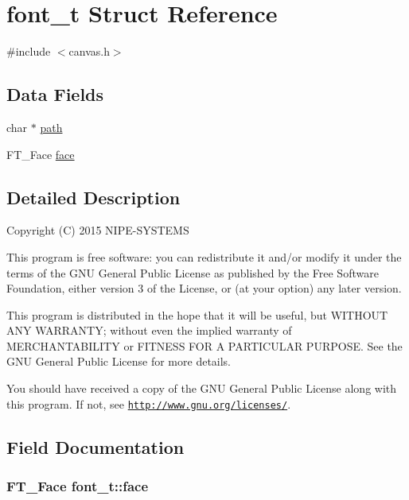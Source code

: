 \hypertarget{structfont__t}{}\section{font\+\_\+t Struct Reference}
\label{structfont__t}


{\ttfamily \#include $<$canvas.\+h$>$}

\subsection*{Data Fields}
\begin{DoxyCompactItemize}
\item 
char $\ast$ \hyperlink{structfont__t_aa3c5e0635a023f249f7f46200e1a4267}{path}
\item 
F\+T\+\_\+\+Face \hyperlink{structfont__t_a3202af0602b252c4db01cdefcd3691d4}{face}
\end{DoxyCompactItemize}


\subsection{Detailed Description}
Copyright (C) 2015 N\+I\+P\+E-\/\+S\+Y\+S\+T\+E\+M\+S

This program is free software\+: you can redistribute it and/or modify it under the terms of the G\+N\+U General Public License as published by the Free Software Foundation, either version 3 of the License, or (at your option) any later version.

This program is distributed in the hope that it will be useful, but W\+I\+T\+H\+O\+U\+T A\+N\+Y W\+A\+R\+R\+A\+N\+T\+Y; without even the implied warranty of M\+E\+R\+C\+H\+A\+N\+T\+A\+B\+I\+L\+I\+T\+Y or F\+I\+T\+N\+E\+S\+S F\+O\+R A P\+A\+R\+T\+I\+C\+U\+L\+A\+R P\+U\+R\+P\+O\+S\+E. See the G\+N\+U General Public License for more details.

You should have received a copy of the G\+N\+U General Public License along with this program. If not, see \href{http://www.gnu.org/licenses/}{\tt http\+://www.\+gnu.\+org/licenses/}. 

\subsection{Field Documentation}
\hypertarget{structfont__t_a3202af0602b252c4db01cdefcd3691d4}{}
\subsubsection[{face}]{\setlength{\rightskip}{0pt plus 5cm}F\+T\+\_\+\+Face font\+\_\+t\+::face}\label{structfont__t_a3202af0602b252c4db01cdefcd3691d4}
\hypertarget{structfont__t_aa3c5e0635a023f249f7f46200e1a4267}{}

